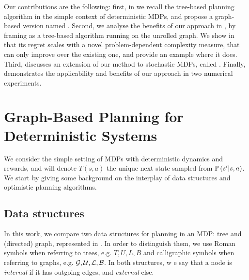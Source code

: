\documentclass[runningheads]{llncs}
\begin{document}
Our contributions are the following: first, in  we recall the \OPD tree-based planning algorithm in the simple context of deterministic MDPs, and propose a graph-based version named \GBOPD. Second, we analyse the benefits of our approach in , by framing \GBOPD as a tree-based algorithm running on the unrolled graph. We show in  that its regret scales with a novel problem-dependent complexity measure, that can only improve over the existing one, and provide an example where it does. Third,  discusses an extension of our method to stochastic MDPs, called \GBOP. Finally,  demonstrates the applicability and benefits of our approach in two numerical experiments.

\section{Graph-Based Planning for Deterministic Systems}
\label{sec:gbopd}

We consider the simple setting of MDPs with deterministic dynamics and rewards, and will denote $T(s,a)$ the unique next state sampled from $\mathbb{P}\left(s'|s,a\right)$.
We start by giving some background on the interplay of data structures and optimistic planning algorithms.

\subsection{Data structures}

In this work, we compare two data structures for planning in an MDP: tree and (directed) graph, represented in . In order to distinguish them, we use Roman symbols when referring to trees, e.g. $T, U, L, B$ and calligraphic symbols when referring to graphs, e.g. $\mathcal{G}, \mathcal{U}, \mathcal{L}, \mathcal{B}$. In both structures, w	e say that a node is \emph{internal} if it has outgoing edges, and \emph{external} else.
\end{document}
